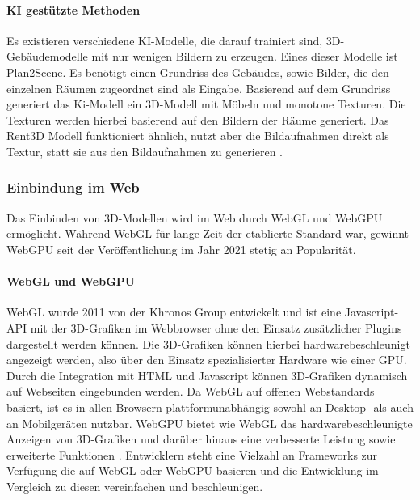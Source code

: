 \paragraph{KI gestützte Methoden}
Es existieren verschiedene KI-Modelle, die darauf trainiert sind, 3D-Gebäudemodelle mit nur wenigen Bildern zu erzeugen. Eines dieser Modelle ist Plan2Scene. Es benötigt einen Grundriss des Gebäudes, sowie Bilder, die den einzelnen Räumen zugeordnet sind als Eingabe. Basierend auf dem Grundriss generiert das Ki-Modell ein 3D-Modell mit Möbeln und monotone Texturen. Die Texturen werden hierbei basierend auf den Bildern der Räume generiert.\cite[S.~10733]{Plan2Scene2021} Das Rent3D Modell funktioniert ähnlich, nutzt aber die Bildaufnahmen direkt als Textur, statt sie aus den Bildaufnahmen zu generieren \cite[S.~3413]{Rent3D2015}.

\subsubsection{Einbindung im Web}
Das Einbinden von 3D-Modellen wird im Web durch \ac{WebGL} und WebGPU ermöglicht. Während \ac{WebGL} für lange Zeit der etablierte Standard war, gewinnt WebGPU seit der Veröffentlichung im Jahr 2021 stetig an Popularität.

\paragraph{WebGL und WebGPU}
\ac{WebGL} wurde 2011 von der Khronos Group entwickelt und ist eine Javascript-API mit der 3D-Grafiken im Webbrowser ohne den Einsatz zusätzlicher Plugins dargestellt werden können. Die 3D-Grafiken können hierbei hardwarebeschleunigt angezeigt werden, also über den Einsatz spezialisierter Hardware wie einer \ac{GPU}. Durch die Integration mit HTML und Javascript können 3D-Grafiken dynamisch auf Webseiten eingebunden werden. Da \ac{WebGL} auf offenen Webstandards basiert, ist es in allen Browsern plattformunabhängig sowohl an Desktop- als auch an Mobilgeräten nutzbar.\cite[S.~17-19]{Parisi2014} WebGPU bietet wie WebGL das hardwarebeschleunigte Anzeigen von 3D-Grafiken und darüber hinaus eine verbesserte Leistung sowie erweiterte Funktionen \cite{Surma2022}. Entwicklern steht eine Vielzahl an Frameworks zur Verfügung die auf \ac{WebGL} oder WebGPU basieren \cite{Seguin2024} und die Entwicklung im Vergleich zu diesen vereinfachen und beschleunigen.

